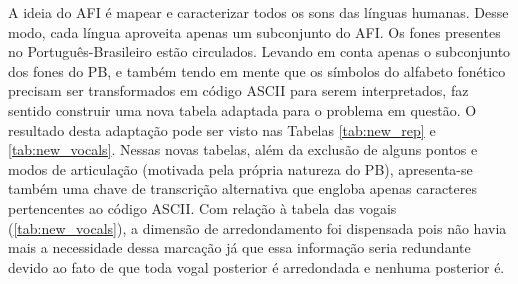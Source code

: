 A ideia do AFI é mapear e caracterizar todos os sons das línguas humanas. Desse modo, cada língua aproveita apenas um subconjunto do AFI. Os fones presentes no Português-Brasileiro estão circulados. Levando em conta apenas o subconjunto dos fones do PB, e também tendo em mente que os símbolos do alfabeto fonético precisam ser transformados em código ASCII para serem interpretados, faz sentido construir uma nova tabela adaptada para o problema em questão. O resultado desta adaptação pode ser visto nas Tabelas \ref{tab:new_rep} e \ref{tab:new_vocals}. Nessas novas tabelas, além da exclusão de alguns pontos e modos de articulação (motivada pela própria natureza do PB), apresenta-se também uma chave de transcrição alternativa que engloba apenas caracteres pertencentes ao código ASCII. Com relação à tabela das vogais (\ref{tab:new_vocals}), a dimensão de arredondamento foi dispensada pois não havia mais a necessidade dessa marcação já que essa informação seria redundante devido ao fato de que toda vogal posterior é arredondada e nenhuma posterior é.

